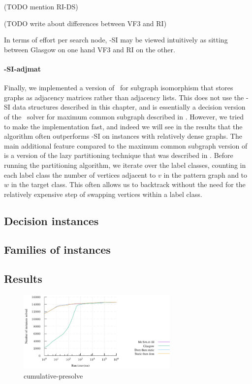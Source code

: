 (TODO mention RI-DS)

(TODO write about differences between VF3 and RI)

In terms of effort per search node, \McSplit-SI may be viewed intuitively as sitting
between Glasgow on one hand VF3 and RI on the other.

\paragraph*{\McSplit-SI-adjmat} Finally, we implemented a version of \McSplit\
for subgraph isomorphism that stores graphs as adjacency matrices rather than
adjacency lists.  This does not use the \McSplit-SI data structures described
in this chapter, and is essentially a decision version of the \McSplit\ solver
for maximum common subgraph described in \label{c:mcsplit-i-undirected}.
However, we tried to make the implementation fast, and indeed we will see in
the results that the algorithm often outperforms \McSplit-SI on instances with
relatively dense graphs.  The main additional feature compared to the maximum
common subgraph version of \McSplit is a version of the lazy partitioning
technique that was described in \Cref{subsec:lazy-partitioning}.  Before
running the partitioning algorithm, we iterate over the label classes, counting
in each label class the number of vertices adjacent to $v$ in the pattern graph
and to $w$ in the target class.  This often allows us to backtrack without the
need for the relatively expensive step of swapping vertices within a label
class.

\subsection{Decision instances}

\subsection{Families of instances}

\subsection{Results}

\begin{figure}[h!]
    \centering
    \includegraphics*[width=0.7\textwidth]{14b-mcsplit-induced-si/decision-instances-experiment/experiment/plots/cumulative-presolve}
    \caption{cumulative-presolve}
    \label{figure:cumulative-presolve}
\end{figure}

